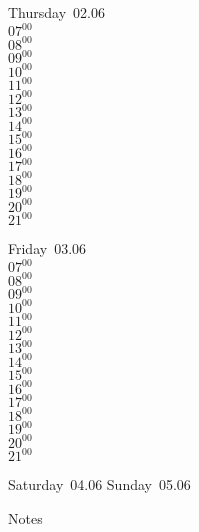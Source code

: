 \documentclass[11pt,a4paper]{book}\usepackage[]{graphicx}\usepackage[]{color}
\begin{document}
\clearpage
\begin{headerbox}
\end{headerbox}
\begin{weekdaybox}
  Thursday~02.06\\
  { 
  \vfill
  $07^{00}$\\
$08^{00}$\\
$09^{00}$\\
$10^{00}$\\
$11^{00}$\\
$12^{00}$\\
$13^{00}$\\
$14^{00}$\\
$15^{00}$\\
$16^{00}$\\
$17^{00}$\\
$18^{00}$\\
$19^{00}$\\
$20^{00}$\\
$21^{00}$\\
  }
\end{weekdaybox} 
\begin{weekdaybox}
  Friday~03.06\\
  { 
  \vfill
  $07^{00}$\\
$08^{00}$\\
$09^{00}$\\
$10^{00}$\\
$11^{00}$\\
$12^{00}$\\
$13^{00}$\\
$14^{00}$\\
$15^{00}$\\
$16^{00}$\\
$17^{00}$\\
$18^{00}$\\
$19^{00}$\\
$20^{00}$\\
$21^{00}$\\
  }
\end{weekdaybox}
\begin{weekendbox}
  Saturday~04.06
  \tcblower
  Sunday~05.06
\end{weekendbox} %
\begin{notebox}
  Notes
\end{notebox}
\clearpage
\end{document}
